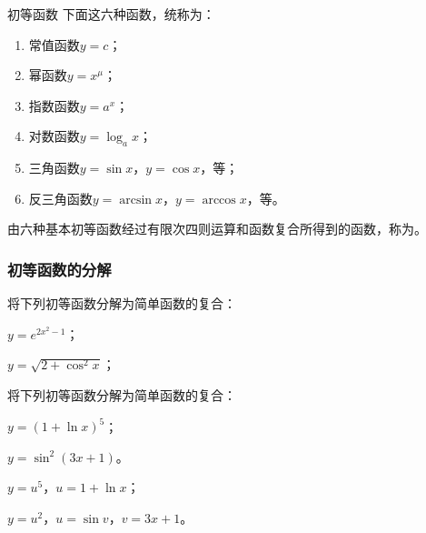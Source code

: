 \documentclass[14pt,notheorems,leqno,xcolor={rgb}]{beamer} %
\begin{document}
\begin{frame}{初等函数}
下面这六种函数，统称为：
\begin{enumerate}[<+->]
  \item 常值函数$y=c$；
  \item 幂函数$y=x^\mu$；
  \item 指数函数$y=a^x$；
  \item 对数函数$y=\log_ax$；
  \item 三角函数$y=\sin x$，$y=\cos x$，等；
  \item 反三角函数$y=\arcsin x$，$y=\arccos x$，等。
\end{enumerate}
\onslide<+->
由六种基本初等函数经过有限次四则运算和函数复合所得到的函数，称为。
\end{frame}

\begin{oframe}
\frametitle{初等函数的分解}
\begin{example}
将下列初等函数分解为简单函数的复合：
\begin{enumlite}
  \item $y=e^{2x^2-1}$；
  \item $y=\sqrt{2+\cos^2 x}$；
\end{enumlite}
\end{example}
\vpause
\begin{exercise}
将下列初等函数分解为简单函数的复合：
\begin{enumlite}
  \item $y=(1+\ln x)^5$；
  \item $y=\sin^2(3x+1)$。
\end{enumlite}
\end{exercise}
\pause
\begin{solution}
\begin{enumlite}
  \item $y=u^5$，$u=1+\ln x$；
  \item $y=u^2$，$u=\sin v$，$v=3x+1$。
\end{enumlite}
\end{solution}
\end{oframe}

\end{document}
